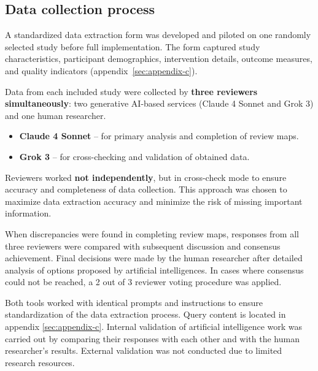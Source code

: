 \documentclass[
hf,
]{ceurart}
\begin{document}
\subsection{Data collection process}

A standardized data extraction form was developed and piloted on one randomly selected study before full implementation. The form captured study characteristics, participant demographics, intervention details, outcome measures, and quality indicators (appendix~\ref{sec:appendix-c}). %

Data from each included study were collected by \textbf{three reviewers simultaneously}: two generative AI-based services (Claude 4 Sonnet and Grok 3) and one human researcher.

\begin{itemize}
\item \textbf{Claude 4 Sonnet} -- for primary analysis and completion of review maps.
\item \textbf{Grok 3} -- for cross-checking and validation of obtained data.
\end{itemize}

Reviewers worked \textbf{not independently}, but in cross-check mode to ensure accuracy and completeness of data collection. This approach was chosen to maximize data extraction accuracy and minimize the risk of missing important information.

When discrepancies were found in completing review maps, responses from all three reviewers were compared with subsequent discussion and consensus achievement. Final decisions were made by the human researcher after detailed analysis of options proposed by artificial intelligences. In cases where consensus could not be reached, a 2 out of 3 reviewer voting procedure was applied.

Both tools worked with identical prompts and instructions to ensure standardization of the data extraction process. Query content is located in appendix \ref{sec:appendix-c}. Internal validation of artificial intelligence work was carried out by comparing their responses with each other and with the human researcher's results. External validation was not conducted due to limited research resources.


\end{document}
